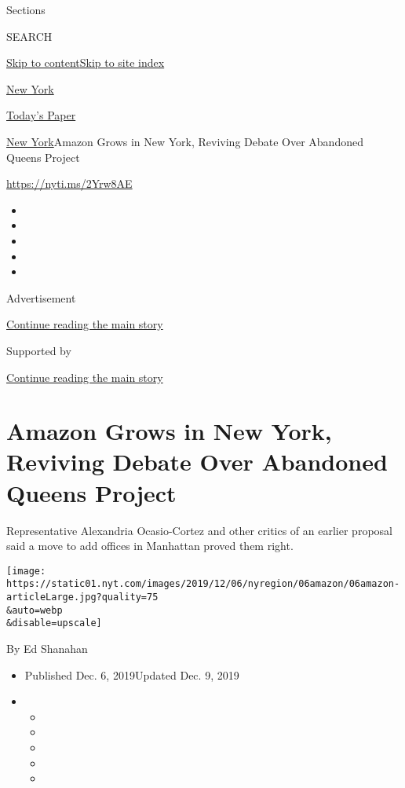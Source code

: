 Sections

SEARCH

\protect\hyperlink{site-content}{Skip to
content}\protect\hyperlink{site-index}{Skip to site index}

\href{https://www.nytimes.com/section/nyregion}{New York}

\href{https://myaccount.nytimes.com/auth/login?response_type=cookie\&client_id=vi}{}

\href{https://www.nytimes.com/section/todayspaper}{Today's Paper}

\href{/section/nyregion}{New York}\textbar{}Amazon Grows in New York,
Reviving Debate Over Abandoned Queens Project

\url{https://nyti.ms/2Yrw8AE}

\begin{itemize}
\item
\item
\item
\item
\item
\end{itemize}

Advertisement

\protect\hyperlink{after-top}{Continue reading the main story}

Supported by

\protect\hyperlink{after-sponsor}{Continue reading the main story}

\hypertarget{amazon-grows-in-new-york-reviving-debate-over-abandoned-queens-project}{%
\section{Amazon Grows in New York, Reviving Debate Over Abandoned Queens
Project}\label{amazon-grows-in-new-york-reviving-debate-over-abandoned-queens-project}}

Representative Alexandria Ocasio-Cortez and other critics of an earlier
proposal said a move to add offices in Manhattan proved them right.

\texttt{[image: https://static01.nyt.com/images/2019/12/06/nyregion/06amazon/06amazon-articleLarge.jpg?quality=75\\\&auto=webp\\\&disable=upscale]}

By Ed Shanahan

\begin{itemize}
\item
  Published Dec. 6, 2019Updated Dec. 9, 2019
\item
  \begin{itemize}
  \item
  \item
  \item
  \item
  \item
  \end{itemize}
\end{itemize}

